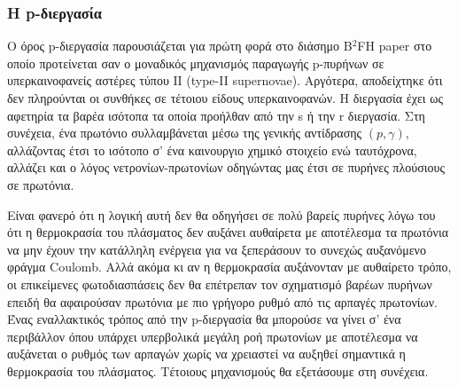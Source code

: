 \subsubsection{Η p-διεργασία}
Ο όρος p-διεργασία παρουσιάζεται για πρώτη φορά στο διάσημο B$^2$FH paper στο οποίο προτείνεται σαν ο μοναδικός μηχανισμός παραγωγής p-πυρήνων σε υπερκαινοφανείς αστέρες τύπου ΙΙ (type-II supernovae). Αργότερα, αποδείχτηκε ότι δεν πληρούνται οι συνθήκες σε τέτοιου είδους υπερκαινοφανών.
Η διεργασία έχει ως αφετηρία τα βαρέα ισότοπα τα οποία προήλθαν από την s ή την r διεργασία. Στη συνέχεια, ένα πρωτόνιο συλλαμβάνεται μέσω της γενικής αντίδρασης $(p, \gamma)$, αλλάζοντας έτσι το ισότοπο σ' ένα καινουργιο χημικό στοιχείο ενώ ταυτόχρονα, αλλάζει και ο λόγος νετρονίων-πρωτονίων οδηγώντας μας έτσι σε πυρήνες πλούσιους σε πρωτόνια.

Είναι φανερό ότι η λογική αυτή δεν θα οδηγήσει σε πολύ βαρείς πυρήνες λόγω του ότι η θερμοκρασία του πλάσματος δεν αυξάνει αυθαίρετα με αποτέλεσμα τα πρωτόνια να μην έχουν την κατάλληλη ενέργεια για να ξεπεράσουν το συνεχώς αυξανόμενο φράγμα Coulomb. Αλλά ακόμα κι αν η θερμοκρασία αυξάνονταν με αυθαίρετο τρόπο, οι επικείμενες φωτοδιασπάσεις δεν θα επέτρεπαν τον σχηματισμό βαρέων πυρήνων επειδή θα αφαιρούσαν πρωτόνια με πιο γρήγορο ρυθμό από τις αρπαγές πρωτονίων. Ένας εναλλακτικός τρόπος από την p-διεργασία θα μπορούσε να γίνει σ' ένα περιβάλλον όπου υπάρχει υπερβολικά μεγάλη ροή πρωτονίων με αποτέλεσμα να αυξάνεται ο ρυθμός των αρπαγών χωρίς να χρειαστεί να αυξηθεί σημαντικά η θερμοκρασία του πλάσματος. Τέτοιους μηχανισμούς θα εξετάσουμε στη συνέχεια.

